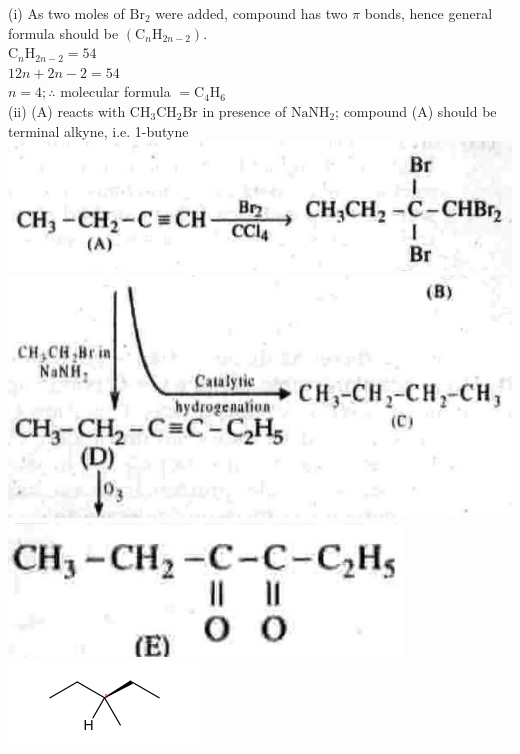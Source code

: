 \documentclass[10pt]{article}
\begin{document}
(i) As two moles of $\mathrm{Br}_{2}$ were added, compound has two $\pi$ bonds, hence general formula should be $\left(\mathrm{C}_{n} \mathrm{H}_{2 n-2}\right)$.\\
$\mathrm{C}_{n} \mathrm{H}_{2 n-2}=54$\\
$12 n+2 n-2=54$\\
$n=4 ; \therefore$ molecular formula $=\mathrm{C}_{4} \mathrm{H}_{6}$\\
(ii) (A) reacts with $\mathrm{CH}_{3} \mathrm{CH}_{2} \mathrm{Br}$ in presence of $\mathrm{NaNH}_{2}$; compound (A) should be terminal alkyne, i.e. 1-butyne\\
\includegraphics[max width=\textwidth, center]{2025_01_28_8470952b98110cec3aabg-247(8)}\\
\includegraphics[max width=\textwidth, center]{2025_01_28_8470952b98110cec3aabg-247(6)}\\
\includegraphics[max width=\textwidth, center]{2025_01_28_8470952b98110cec3aabg-247(3)}\\
\includegraphics{smile-a41aaa23a294a7cbb4815e61ebff29e1520ed01e}\\
\end{document}
